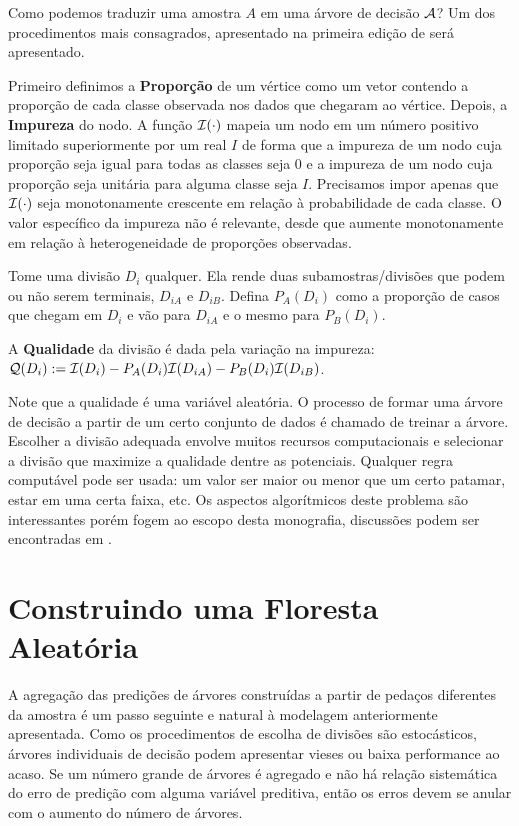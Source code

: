 Como podemos traduzir uma amostra $A$ em uma árvore de decisão $\mathcal{A}$? Um dos procedimentos mais consagrados, apresentado na primeira edição de  será apresentado.

Primeiro definimos a \textbf{Proporção} de um vértice como um vetor contendo a proporção de cada classe observada nos dados que chegaram ao vértice. Depois, a \textbf{Impureza} do nodo. A função $\mathcal{I}(\cdot)$ mapeia um nodo em um número positivo limitado superiormente por um real $I$ de forma que a impureza de um nodo cuja proporção seja igual para todas as classes seja $0$ e a impureza de um nodo cuja proporção seja unitária para alguma classe seja $I$. Precisamos impor apenas que $\mathcal{I}(\cdot)$ seja monotonamente crescente em relação à probabilidade de cada classe. O valor específico da impureza não é relevante, desde que aumente monotonamente em relação à heterogeneidade de proporções observadas.

Tome uma divisão $D_i$ qualquer. Ela rende duas subamostras/divisões que podem ou não serem terminais, $D_{iA}$ e $D_{iB}$. Defina $P_A (D_i)$ como a proporção de casos que chegam em $D_i$ e vão para $D_{iA}$ e o mesmo para $P_B (D_i)$.

\begin{defi}
A \textbf{Qualidade} da divisão é dada pela variação na impureza: $\mathcal{Q} (D_i) := \mathcal{I}(D_i) - P_A(D_i) \mathcal{I} (D_{iA}) - P_B(D_i) \mathcal{I} (D_{iB})$.
\end{defi}

Note que a qualidade é uma variável aleatória. O processo de formar uma árvore de decisão a partir de um certo conjunto de dados é chamado de treinar a árvore. Escolher a divisão adequada envolve muitos recursos computacionais e selecionar a divisão que maximize a qualidade dentre as potenciais. Qualquer regra computável pode ser usada: um valor ser maior ou menor que um certo patamar, estar em uma certa faixa, etc. Os aspectos algorítmicos deste problema são interessantes porém fogem ao escopo desta monografia, discussões podem ser encontradas em .
 
 \section{Construindo uma Floresta Aleatória}
 
 A agregação das predições de árvores construídas a partir de pedaços diferentes da amostra é um passo seguinte e natural à modelagem anteriormente apresentada. Como os procedimentos de escolha de divisões são estocásticos, árvores individuais de decisão podem apresentar vieses ou baixa performance ao acaso. Se um número grande de árvores é agregado e não há relação sistemática do erro de predição com alguma variável preditiva, então os erros devem se anular com o aumento do número de árvores.
 
